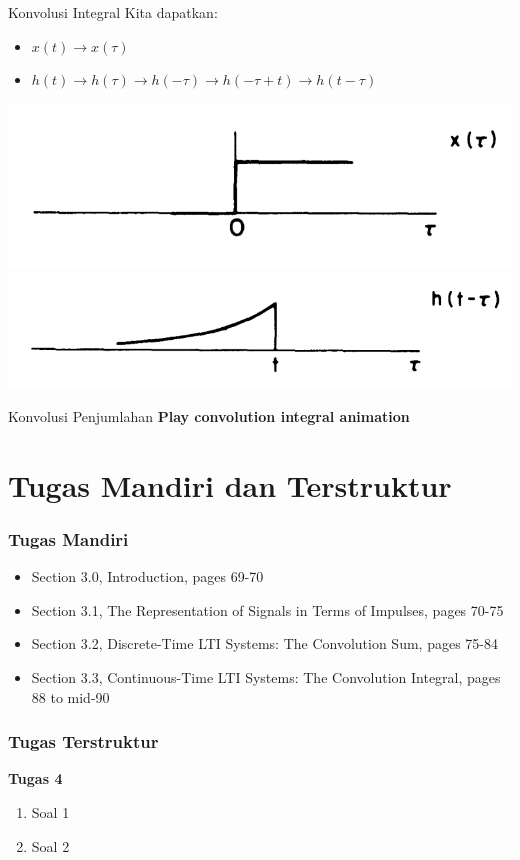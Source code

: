 \documentclass[pdflatex,compress,mathserif]{beamer}
\begin{document}
\begin{frame}{Konvolusi Integral}
	Kita dapatkan:\\
	\begin{itemize}
		\item $ x(t) \rightarrow x(\tau) $
		\item $ h(t) \rightarrow h(\tau) \rightarrow h(-\tau) \rightarrow h(-\tau+t) \rightarrow h(t-\tau)$
	\end{itemize}
	
	\begin{center}
		\includegraphics[width=0.8\linewidth]{img/img14}
		\includegraphics[width=0.8\linewidth]{img/img15}
	\end{center}
	
\end{frame}

\begin{frame}{Konvolusi Penjumlahan}
	\textbf{Play convolution integral animation}
\end{frame}


\section{Tugas Mandiri dan Terstruktur}

\begin{frame}
	\frametitle{Tugas Mandiri}
	\begin{itemize}
		\item Section 3.0, Introduction, pages 69-70
		\item Section 3.1, The Representation of Signals in Terms of Impulses, pages 70-75
		\item Section 3.2, Discrete-Time LTI Systems: The Convolution Sum, pages 75-84
		\item Section 3.3, Continuous-Time LTI Systems: The Convolution Integral, pages 88 to mid-90
	\end{itemize}
\end{frame}

\begin{frame}
	\frametitle{Tugas Terstruktur}
	\textbf{Tugas 4}
	\begin{enumerate}
		\item Soal 1 
		\item Soal 2
	\end{enumerate}
\end{frame}
\end{document}
